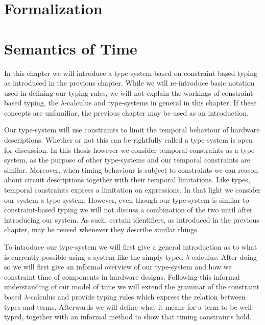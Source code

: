 
\chapter{Formalization}
\chapter{Semantics of Time}
In this chapter we will introduce a type-system based on constraint based typing as introduced in the previous chapter.
While we will re-introduce basic notation used in defining our typing rules, we will not explain the workings of constraint based typing, the $\lambda$-calculus and type-systems in general in this chapter.
If these concepts are unfamiliar, the previous chapter may be used as an introduction. 

Our type-system will use constraints to limit the temporal behaviour of hardware descriptions.
Whether or not this can be rightfully called a type-system is open for discussion.
In this thesis however we consider temporal constraints as a type-system, as the purpose of other type-systems and our temporal constraints are similar.
Moreover, when timing behaviour is subject to constraints we can reason about circuit descriptions together with their temporal limitations.
Like types, temporal constraints express a limitation on expressions.
In that light we consider our system a type-system.
However, even though our type-system is similar to constraint-based typing we will not discuss a combination of the two until after introducing our system. 
As such, certain identifiers, as introduced in the previous chapter, may be reused whenever they describe similar things. 

To introduce our type-system we will first give a general introduction as to what is currently possible using a system like the simply typed $\lambda$-calculus.
After doing so we will first give an informal overview of our type-system and how we constraint time of components in hardware designs.
Following this informal understanding of our model of time we will extend the grammar of the constraint based $\lambda$-calculus and provide typing rules which express the relation between types and terms.
Afterwards we will define what it means for a term to be well-typed, together with an informal method to show that timing constraints hold.

